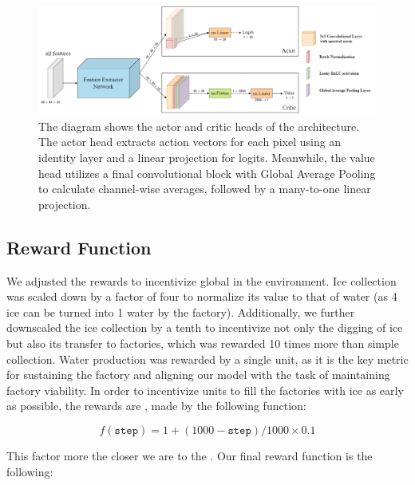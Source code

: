 \begin{figure}[htbp]
    \centering
    \includegraphics[width=1\linewidth]{images/methods_mono/actor_critic/actor-critic-head.png}
    \captionsetup{justification=justified, singlelinecheck=false, width=1\linewidth, labelfont=bf} 
    \caption[]{The diagram shows the actor and critic heads of the architecture. The actor head extracts action vectors for each pixel using an identity layer and a linear projection for logits. Meanwhile, the value head utilizes a final convolutional block with Global Average Pooling to calculate channel-wise averages, followed by a many-to-one linear projection.}
    \label{fig:mono-actor-critic}
\end{figure}

\subsection{Reward Function}
\label{sec:monolithic-reward-function}

\noindent We adjusted the rewards to incentivize global  in the environment. Ice collection was scaled down by a factor of four to normalize its value to that of water (as 4 ice can be turned into 1 water by the factory). Additionally, we further downscaled the ice collection by a tenth to incentivize not only the digging of ice but also its transfer to factories, which was rewarded 10 times more than simple collection. Water production was rewarded by a single unit, as it is the key metric for sustaining the factory and aligning our model with the task of maintaining factory viability. In order to incentivize units to fill the factories with ice as early as possible, the rewards are , made by the following function:

\begin{equation}
    f(\texttt{step}) = 1 + (1000 - \texttt{step}) / 1000 \times 0.1
    \label{eq:reward-early-scaling}
\end{equation}

\noindent This factor  more the closer we are to the . Our final reward function is the following: 

